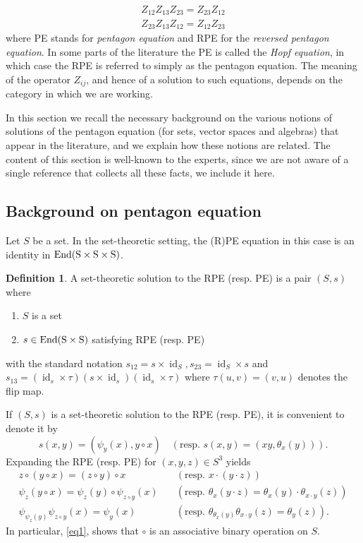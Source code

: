 \documentclass[a4paper,10pt]{amsart}
\theoremstyle{definition}
\newtheorem{definition}[lemma]{Definition}
\theoremstyle{remark}
\newcommand\End{\rm End}
\DeclareMathOperator{\id}{id}
\begin{document}
\begin{align}
Z_{12}Z_{13}Z_{23} = Z_{23} Z_{12} \tag{RPE}\\
Z_{23} Z_{13} Z_{12} = Z_{12} Z_{23} \tag{PE}
\end{align}
where PE stands for \emph{pentagon equation} and RPE for the \emph{reversed pentagon equation}. In some parts of the literature the PE is called the \emph{Hopf equation}, in which case the RPE is referred to simply as the pentagon equation. The meaning of the operator $Z_{ij}$, and hence of a solution to such equations, depends on the category in which we are working.

In this section we recall the necessary background on the various notions of solutions of the pentagon equation (for sets, vector spaces and algebras) that appear in the literature, and we explain how these notions are related. The content of this section is well-known to the experts, since we are not aware of a  single reference that collects all these facts, we include it here.

\subsection{Background on pentagon equation}

Let $S$ be a set. In the set-theoretic setting, the (R)PE equation in this case is an identity in $\End(S\times S\times S)$.

\begin{definition}\label{def set PE}
A set-theoretic solution to the RPE (resp. PE) is a pair $(S,s)$ where 
\begin{enumerate}
    \item $S$ is a set
    \item $s \in \End (S\times S)$ satisfying RPE (resp. PE)
\end{enumerate}
with the standard notation $s_{12} = s \times \id_S, s_{23} = \id_S \times s$ and $s_{13} = (\id_s \times \tau)(s \times \id_s)(\id_s \times \tau)$ where $\tau(u,v) = (v,u)$ denotes the flip map. 
\end{definition}

If $(S,s)$ is a set-theoretic solution to the RPE (resp. PE), it is convenient to denote it by
$$s(x,y) = (\psi_y(x), y\circ x) \quad (\text{resp. } s(x,y) =(xy, \theta_x(y))).$$
Expanding the RPE (resp. PE) for $(x,y,z)\in S^3$ yields 
\begin{align}
    z\circ(y\circ x) = (z\circ y) \circ x\quad &(\text{resp. } x\cdot(y\cdot z))\label{eq1}\\
    \psi_z(y\circ x) = \psi_z(y)\circ \psi_{z\circ y}(x)\quad&(\text{resp. } \theta_x(y\cdot z) = \theta_x(y)\cdot \theta_{x\cdot y}(z))\label{eq2}\\
    \psi_{\psi_z(y)}\psi_{z\circ y}(x) =\psi_y(x)\quad &(\text{resp. }\theta_{\theta_x(y)}\theta_{x\cdot y}(z) =\theta_y(z)).\label{eq3}
\end{align}
In particular, \eqref{eq1}, shows that $\circ$ is an associative binary operation on $S$.
\end{document}
